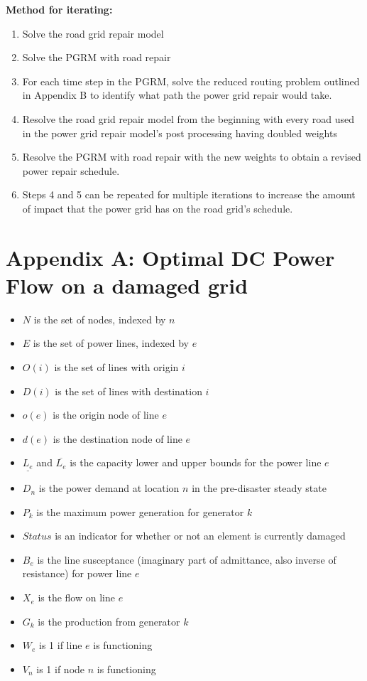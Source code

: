 \documentclass{article}
\begin{document}
\textbf{Method for iterating:}

\begin{enumerate}
	\item Solve the road grid repair model
	\item Solve the PGRM with road repair
	\item For each time step in the PGRM, solve the reduced routing problem outlined in Appendix B to identify what path the power grid repair would take.
	\item Resolve the road grid repair model from the beginning with every road used in the power grid repair model's post processing having doubled weights
	\item Resolve the PGRM with road repair with the new weights to obtain a revised power repair schedule.
	\item Steps 4 and 5 can be repeated for multiple iterations to increase the amount of impact that the power grid has on the road grid's schedule.
\end{enumerate}


\section{Appendix A: Optimal DC Power Flow on a damaged grid}
\begin{itemize}
	\item $N$ is the set of nodes, indexed by $n$
	\item $E$ is the set of power lines, indexed by $e$
	\item $O(i)$ is the set of lines with origin $i$
	\item $D(i)$ is the set of lines with destination $i$
	\item $o(e)$ is the origin node of line $e$
	\item $d(e)$ is the destination node of line $e$
	\item $\underline{L_e}$ and $\overline{L_e}$ is the capacity lower and upper bounds for the power line $e$
	\item $D_n$ is the power demand at location $n$ in the pre-disaster steady state
	\item $P_k$ is the maximum power generation for generator $k$
	\item $Status$ is an indicator for whether or not an element is currently damaged
	\item $B_e$ is the line susceptance (imaginary part of admittance, also inverse of resistance) for power line $e$
	\item $X_{e}$ is the flow on line $e$ 
	\item $G_{k}$ is the production from generator $k$
	\item $W_{e}$ is 1 if line $e$ is functioning 
	\item $V_n$ is 1 if node $n$ is functioning 
\end{itemize}
\end{document}
